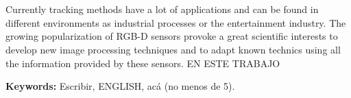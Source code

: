 \chapter*{\runtitle}


\noindent Currently tracking methods have a lot of applications and can be found in different environments as industrial processes or the entertainment industry. The growing popularization of RGB-D sensors provoke a great scientific interests to develop new image processing techniques and to adapt known technics using all the information provided by these sensors. EN ESTE TRABAJO

\bigskip

\noindent\textbf{Keywords:} Escribir, ENGLISH, acá (no menos de 5).



